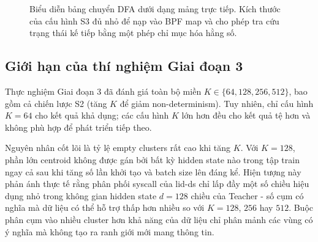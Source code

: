 \documentclass[../main.tex]{subfiles}
\begin{document}
\begin{figure}[H]
  \centering
  \caption{Biểu diễn bảng chuyển DFA dưới dạng mảng trực tiếp. Kích
    thước của cấu hình
    S3 đủ nhỏ để nạp vào BPF map và cho phép tra cứu trạng thái kế
    tiếp bằng một phép
  chỉ mục hóa hằng số.}
  \label{fig:bpf_table}
\end{figure}

\subsection{Giới hạn của thí nghiệm Giai đoạn 3}
\label{subsec:p3_limits}

Thực nghiệm Giai đoạn 3 đã đánh giá toàn bộ miền $K \in \{64, 128,
256, 512\}$, bao gồm cả chiến lược S2 (tăng $K$ để giảm
non-determinism). Tuy nhiên, chỉ cấu hình $K = 64$ cho kết quả khả
dụng; các cấu hình $K$ lớn hơn đều cho kết quả tệ hơn và không phù
hợp để phát triển tiếp theo.

Nguyên nhân cốt lõi là tỷ lệ empty clusters rất cao khi tăng $K$.
Với $K = 128$, phần lớn centroid không được gán bởi bất kỳ hidden
state nào trong tập train ngay cả sau khi tăng số lần khởi tạo và
batch size lên đáng kể. Hiện tượng này phản ánh thực tế rằng phân
phối \gls{syscall} của \gls{lid-ds}
chỉ lấp đầy một số chiều hiệu dụng nhỏ trong không gian hidden state
$d = 128$ chiều của Teacher - số cụm có nghĩa mà dữ liệu có thể hỗ
trợ thấp hơn nhiều so với $K = 128$, $256$ hay $512$. Buộc phân cụm
vào nhiều cluster hơn khả năng của dữ liệu chỉ phân mảnh các vùng có
ý nghĩa mà không tạo ra ranh giới mới mang thông tin.
\end{document}
